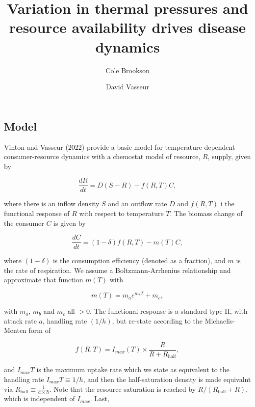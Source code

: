 \documentclass[
  letterpaper,
  DIV=11,
  numbers=noendperiod]{scrartcl}
\title{Variation in thermal pressures and resource availability drives
disease dynamics}
\author{Cole Brookson \and David Vasseur}
\date{}
\renewcommand*\contentsname{Table of contents}
\newcommand\contentsname{Table of contents}
\begin{document}
\maketitle

\renewcommand*\contentsname{Table of contents}
{
\hypersetup{linkcolor=}
\setcounter{tocdepth}{3}
\tableofcontents
}
\subsection{Model}\label{model}

Vinton and Vasseur (2022) provide a basic model for
temperature-dependent consumer-resource dynamics with a chemostat model
of resource, \(R\), supply, given by

\begin{equation}
\label{eq:resource-growth}
\frac{dR}{dt} = D(S-R) - f(R,T)C,
\end{equation}

where there is an inflow density \(S\) and an outflow rate \(D\) and
\(f(R,T)\) i the functional response of \(R\) with respect to
temperature \(T\). The biomass change of the consumer \(C\) is given by

\begin{equation}
\label{eq:consumer-growth}
\frac{dC}{dt} = (1 - \delta)f(R,T) - m(T)C,
\end{equation}

where \((1-\delta)\) is the consumption efficiency (denoted as a
fraction), and \(m\) is the rate of respiration. We assume a
Boltzmann-Arrhenius relationship and approximate that function \(m(T)\)
with

\begin{equation}
\label{eq:respiration-rate}
m(T) = m_ae^{m_bT} + m_c,
\end{equation}

with \(m_a\), \(m_b\) and \(m_c\) all \(>0\). The functional response is
a standard type II, with attack rate \(a\), handling rate \((1/h)\), but
re-state according to the Michaelis-Menten form of

\begin{equation}
\label{eq:functional-response}
f(R,T) = I_{max}(T) \times \frac{R}{R + R_{\text{half}}},
\end{equation}

and \(I_{max}T\) is the maximum uptake rate which we state as equivalent
to the handling rate \(I_{max}T \equiv 1/h\), and then the
half-saturation density is made equivalnt via
\(R_{\text{half}} \equiv \frac{1}{a \times h}\). Note that the resource
saturation is reached by \(R / (R_{\text{half}} + R)\), which is
independent of \(I_{max}\). Last,
\end{document}

